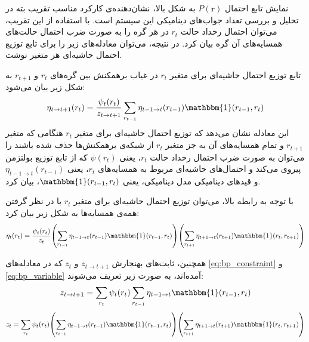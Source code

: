 نمایش تابع احتمال
\( P(\mathbf{r}) \)
به شکل بالا، نشان‌دهنده‌ی کارکرد مناسب تقریب بته در تحلیل و بررسی تعداد جواب‌های دینامیکی این سیستم است.
با استفاده از این تقریب، می‌توان احتمال رخداد حالت
\( r_{t} \)
در هر گره را به صورت ضرب احتمال حالت‌های همسایه‌های آن گره بیان کرد.
در نتیجه، می‌توان معادله‌های زیر را برای تابع توزیع احتمال حاشیه‌ای هر متغیر نوشت.

تابع توزیع احتمال حاشیه‌ای برای متغیر
\( r_{t} \)
در غیاب برهمکنش بین گره‌های
\( r_{t} \) و \( r_{t+1} \)
به شکل زیر بیان می‌شود:
\begin{equation} \label{eq:bp_constraint}
    \eta_{t \to t+1}(r_{t}) = \frac{\psi_{t}(r_{t})}{z_{t \to t+1}} \sum_{r_{t-1}} \eta_{t-1 \to t}(r_{t-1}) \mathbbm{1}(r_{t-1},r_{t})
\end{equation}
این معادله نشان می‌دهد که توزیع احتمال حاشیه‌ای برای متغیر
\( r_{t} \)
هنگامی که متغیر
\( r_{t+1} \)
و تمام همسایه‌های آن به جز متغیر
\( r_{t} \)
از شبکه‌ی برهمکنش‌ها حذف شده باشند را
می‌توان به صورت ضرب احتمال رخداد حالت
\( r_{t} \)،
یعنی
\( \psi(r_{t}) \)
که از تابع توزیع بولتزمن پیروی می‌کند و
احتمال‌های حاشیه‌ای مربوط به همسایه‌های
\( r_{t} \)، یعنی
\( \eta_{t-1 \to t}(r_{t-1}) \)
و قید‌های دینامیکی مدل دینامیکی، یعنی
\( \mathbbm{1}(r_{t-1},r_{t}) \)،
بیان کرد.

با توجه به رابطه بالا، می‌توان
توزیع احتمال حاشیه‌ای برای متغیر
\( r_{t} \)
با در نظر گرفتن همه‌ی همسایه‌ها
به شکل زیر بیان کرد:
\begin{equation} \label{eq:bp_variable}
    \eta_{t}(r_{t}) = \frac{\psi_{t}(r_{t})}{z_{t}} \left( \sum_{r_{t-1}} \eta_{t-1 \to t}(r_{t-1}) \mathbbm{1}(r_{t-1},r_{t}) \right) \left( \sum_{r_{t+1}} \eta_{t+1 \to t}(r_{t+1}) \mathbbm{1}(r_{t},r_{t+1}) \right)
\end{equation}

همچنین، ثابت‌های بهنجارش
\( z_{t \to t+1} \) و \( z_{t} \)
که در معادله‌های
\ref{eq:bp_constraint} و \ref{eq:bp_variable}
آمده‌اند، به صورت زیر تعریف می‌شوند:
\begin{equation} \label{eq:bp_normalization_constraint}
    z_{t \to t+1} = \sum_{r_{t}} \psi_{t}(r_{t}) \sum_{r_{t-1}} \eta_{t-1 \to t} \mathbbm{1}(r_{t-1},r_{t})
\end{equation}
\begin{equation} \label{eq:bp_normalization_variable}
    z_{t} = \sum_{r_{t}} \psi_{t}(r_{t}) \left( \sum_{r_{t-1}} \eta_{t-1 \to t}(r_{t-1}) \mathbbm{1}(r_{t-1},r_{t}) \right) \left( \sum_{r_{t+1}} \eta_{t+1 \to t}(r_{t+1}) \mathbbm{1}(r_{t},r_{t+1}) \right)
\end{equation}

